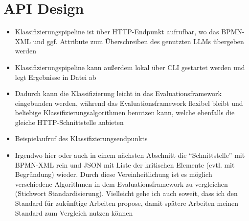 \section{API Design}\label{sec:api}

\begin{itemize}
    \item Klassifizierungspipeline ist über HTTP-Endpunkt aufrufbar, wo das BPMN-XML und ggf. Attribute zum Überschreiben des genutzten LLMs übergeben werden
    \item Klassifizierungspipeline kann außerdem lokal über CLI gestartet werden und legt Ergebnisse in Datei ab
    \item Dadurch kann die Klassifizierung leicht in das Evaluationsframework eingebunden werden, während das Evaluationsframework flexibel bleibt und beliebige Klassifizierungsalgorithmen benutzen kann, welche ebenfalls die gleiche HTTP-Schnittstelle anbieten
    \item Beispielaufruf des Klassifizierungsendpunkts
    \item Irgendwo hier oder auch in einem nächsten Abschnitt die ``Schnittstelle'' mit BPMN-XML rein und JSON mit Liste der kritischen Elemente (evtl. mit Begründung) wieder. Durch diese Vereinheitlichung ist es möglich verschiedene Algorithmen in dem Evaluationsframework zu vergleichen (Stichwort Standardisierung). Vielleicht gehe ich auch soweit, dass ich den Standard für zukünftige Arbeiten propose, damit spätere Arbeiten meinen Standard zum Vergleich nutzen können
\end{itemize}